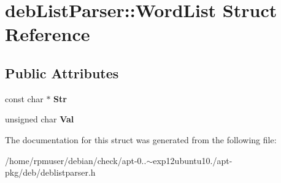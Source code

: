 \section{deb\-List\-Parser\-:\-:\-Word\-List \-Struct \-Reference}
\label{structdebListParser_1_1WordList}
\subsection*{\-Public \-Attributes}
\begin{DoxyCompactItemize}
\item 
const char $\ast$ {\bfseries \-Str}\label{structdebListParser_1_1WordList_a83ddceec53599310a13048586c0a8586}

\item 
unsigned char {\bfseries \-Val}\label{structdebListParser_1_1WordList_a5822b7000f077dc1e2f88a31a6b89a39}

\end{DoxyCompactItemize}


\-The documentation for this struct was generated from the following file\-:\begin{DoxyCompactItemize}
\item 
/home/rpmuser/debian/check/apt-\/0..$\sim$exp12ubuntu10./apt-\/pkg/deb/deblistparser.\-h\end{DoxyCompactItemize}
